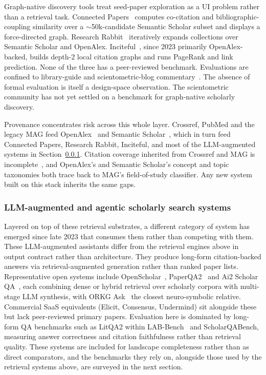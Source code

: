 Graph-native discovery tools treat seed-paper exploration as a UI problem
rather than a retrieval task. Connected
Papers~\cite{smolyansky2020announcing} computes co-citation and
bibliographic-coupling similarity over a $\sim$50k-candidate Semantic Scholar
subset and displays a force-directed graph. Research
Rabbit~\cite{researchrabbit} iteratively expands collections over Semantic
Scholar and OpenAlex. Inciteful~\cite{inciteful_docs}, since 2023 primarily
OpenAlex-backed, builds depth-2 local citation graphs and runs PageRank and
link prediction. None of the three has a peer-reviewed benchmark. Evaluations
are confined to library-guide and scientometric-blog
commentary~\cite{tay2021literaturemapping}. The absence of formal evaluation
is itself a design-space observation. The scientometric community has not yet
settled on a benchmark for graph-native scholarly discovery.

Provenance concentrates risk across this whole layer. Crossref, PubMed and
the legacy MAG feed OpenAlex~\cite{priem2022openalex} and Semantic
Scholar~\cite{kinney2023semanticscholar}, which in turn feed Connected
Papers, Research Rabbit, Inciteful, and most of the LLM-augmented systems in
Section~\ref{subsec:llm-agentic}. Citation coverage inherited from Crossref
and MAG is incomplete~\cite{visser2021largescale}, and OpenAlex's and
Semantic Scholar's concept and topic taxonomies both trace back to MAG's
field-of-study classifier. Any new system built on this stack inherits the
same gaps.

\subsubsection{LLM-augmented and agentic scholarly search systems}
\label{subsec:llm-agentic}

Layered on top of these retrieval substrates, a different category of system
has emerged since late 2023 that consumes them rather than competing with
them. These LLM-augmented assistants differ from the retrieval engines above
in output contract rather than architecture. They produce long-form
citation-backed answers via retrieval-augmented generation rather than ranked
paper lists. Representative
open systems include OpenScholar~\cite{asai2024openscholar},
PaperQA2~\cite{skarlinski2024paperqa2} and Ai2 Scholar
QA~\cite{singh2025ai2scholarqa}, each combining dense or hybrid retrieval
over scholarly corpora with multi-stage LLM synthesis, with ORKG
Ask~\cite{oelen2024orkgask,oelen2026orkgask} the closest neuro-symbolic
relative. Commercial SaaS equivalents (Elicit, Consensus, Undermind) sit
alongside these but lack peer-reviewed primary papers. Evaluation here is
dominated by long-form QA benchmarks such as LitQA2 within
LAB-Bench~\cite{laurent2024labbench} and ScholarQABench, measuring answer
correctness and citation faithfulness rather than retrieval quality. These
systems are included for landscape completeness rather than as direct
comparators, and the benchmarks they rely on, alongside those used by the
retrieval systems above, are surveyed in the next section.

\FloatBarrier